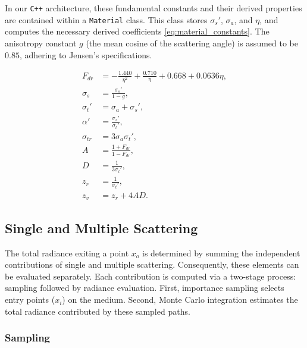 \documentclass[sigconf,nonacm]{acmart}
\begin{document}
In our \texttt{C++} architecture, these fundamental constants and their derived properties are contained within a \texttt{Material} class. This class stores $\sigma_s'$, $\sigma_a$, and $\eta$, and computes the necessary derived coefficients \eqref{eq:material_constants}. The anisotropy constant $g$ (the mean cosine of the scattering angle) is assumed to be $0.85$, adhering to Jensen's specifications.

\begin{subequations}
    \label{eq:material_constants}
    \begin{align}
        F_{dr}      & = -\frac{1.440}{\eta^2} + \frac{0.710}{\eta} + 0.668 + 0.0636 \eta, \\
        \sigma_s    & = \frac{\sigma_s'}{1 - g},                                          \\
        \sigma_t'   & = \sigma_a + \sigma_s',                                             \\
        \alpha'     & = \frac{\sigma_s'}{\sigma_t'},                                      \\
        \sigma_{tr} & = 3 \sigma_a \sigma_t',                                             \\
        A           & = \frac{1 + F_{dr}}{1 - F_{dr}},                                    \\
        D           & = \frac{1}{3 \sigma_t'},                                            \\
        z_r         & = \frac{1}{\sigma_t'},                                              \\
        z_v         & = z_r + 4 A D.
    \end{align}
\end{subequations}


\subsection{Single and Multiple Scattering}

The total radiance exiting a point $x_o$ is determined by summing the independent contributions of single and multiple scattering. Consequently, these elements can be evaluated separately. Each contribution is computed via a two-stage process: sampling followed by radiance evaluation. First, importance sampling selects entry points ($x_i$) on the medium. Second, Monte Carlo integration estimates the total radiance contributed by these sampled paths.

\subsubsection{Sampling}
\end{document}

